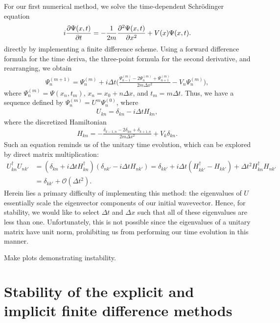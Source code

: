 For our first numerical method, we solve the time-dependent Schr\"{o}dinger equation 
\begin{align}
    i \pdv{\Psi(x,t)}{t} = -\frac{1}{2m} \pdv[2]{\Psi(x,t)}{x} + V(x) \Psi(x,t)
.\end{align}
directly by implementing a finite difference scheme.
Using a forward difference formula for the time deriva, the three-point formula for the second derivative, and rearranging, we obtain
\begin{align}
    \Psi_{n}^{(m + 1)} = \Psi_{n}^{(m)} + i \Delta t \Bigg( \frac{\Psi_{n-1}^{(m)} - 2 \Psi_{n}^{(m)} + \Psi_{n+1}^{(m)}}{2m \Delta x^2} - V_{n} \Psi_{n}^{(m)} \Bigg)
,\end{align}
where $\Psi_{n}^{(m)} = \Psi(x_n,t_{m})$, $x_{n} = x_0 + n \Delta x$, and $t_{m} = m \Delta t$.
Thus, we have a sequence defined by $\Psi_{n}^{(m)} = U^{m} \Psi_{n}^{(0)}$, where
\begin{align}
    U_{kn} = \delta_{kn} - i \Delta t H_{kn}
,\end{align}
where the discretized Hamiltonian
\begin{align}
    H_{kn} = -\frac{\delta_{k-1,n} - 2 \delta_{kn} + \delta_{k+1,n}}{2m \Delta x^2} + V_{k} \delta_{kn}
.\end{align}
Such an equation reminds us of the unitary time evolution, which can be explored by direct matrix multiplication:
\begin{align}
    U_{kn}^{\dagger} U_{nk'} &= ( \delta_{kn} + i \Delta t H_{kn}^{\dagger} ) ( \delta_{nk'} - i \Delta t H_{nk'} ) = \delta_{k k'} + i \Delta t ( H_{kk'}^{\dagger} - H_{kk'} ) + \Delta t^2 H_{kn}^{\dagger} H_{nk'} \nonumber \\
    &= \delta_{kk'} + \mathcal{O}(\Delta t^2)
.\end{align}
Herein lies a primary difficulty of implementing this method: the eigenvalues of $U$ essentially scale the eigenvector components of our initial wavevector.
Hence, for stability, we would like to select $\Delta t$ and $\Delta x$ such that all of these eigenvalues are less than one.
Unfortunately, this is not possible since the eigenvalues of a unitary matrix have unit norm, prohibiting us from performing our time evolution in this manner.

{\color{red} 
    Make plots demonstrating instability.
}


\section{Stability of the explicit and implicit finite difference methods}
\label{app:stability-of-the-explicity-and-implicit-finite-difference-methods}

